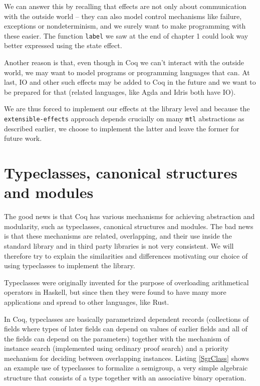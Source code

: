 \documentclass[declaration,inz,english,shortabstract]{iithesis}
\newcommand{\m}[1]{\texttt{#1}}
\begin{document}
We can answer this by recalling that effects are not only about communication with the outside world -- they can also model control mechanisms like failure, exceptions or nondeterminism, and we surely want to make programming with these easier. The function \m{label} we saw at the end of chapter 1 could look way better expressed using the state effect.

Another reason is that, even though in Coq we can't interact with the outside world, we may want to model programs or programming languages that can. At last, IO and other such effects may be added to Coq in the future and we want to be prepared for that (related languages, like Agda \cite{Agda} and Idris \cite{Idris} both have IO).

We are thus forced to implement our effects at the library level and because the \m{extensible-effects} approach depends crucially on many \m{mtl} abstractions as described earlier, we choose to implement the latter and leave the former for future work.

\section{Typeclasses, canonical structures and modules}

The good news is that Coq has various mechanisms for achieving abstraction and modularity, such as typeclasses, canonical structures and modules. The bad news is that these mechanisms are related, overlapping, and their use inside the standard library and in third party libraries is not very consistent. We will therefore try to explain the similarities and differences motivating our choice of using typeclasses to implement the library.

Typeclasses \cite{Classes1} \cite{Classes2} were originally invented for the purpose of overloading arithmetical operators in Haskell, but since then they were found to have many more applications and spread to other languages, like Rust.

In Coq, typeclasses are basically parametrized dependent records (collections of fields where types of later fields can depend on values of earlier fields and all of the fields can depend on the parameters) together with the mechanism of instance search (implemented using ordinary proof search) and a priority mechanism for deciding between overlapping instances. Listing \ref{SgrClass} shows an example use of typeclasses to formalize a semigroup, a very simple algebraic structure that consists of a type together with an associative binary operation.
\end{document}

